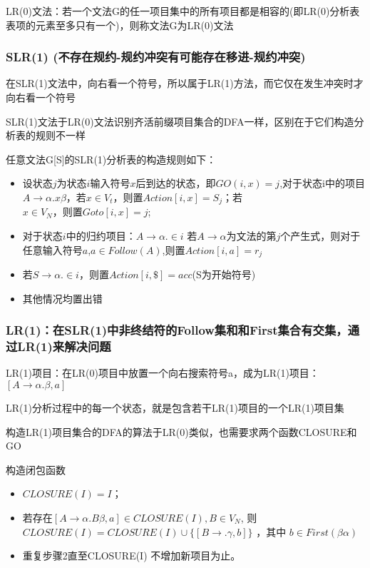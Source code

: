 \documentclass[utf8]{ctexart}
\begin{document}
LR(0)文法：若一个文法G的任一项目集中的所有项目都是相容的(即LR(0)分析表表项的元素至多只有一个)，则称文法G为LR(0)文法


\subsubsection{SLR(1) (不存在规约-规约冲突有可能存在移进-规约冲突)}

在SLR(1)文法中，向右看一个符号，所以属于LR(1)方法，而它仅在发生冲突时才向右看一个符号

SLR(1)文法于LR(0)文法识别齐活前缀项目集合的DFA一样，区别在于它们构造分析表的规则不一样

任意文法G[S]的SLR(1)分析表的构造规则如下：

\begin{itemize}
    \item 设状态$j$为状态$i$输入符号$x$后到达的状态，即$GO(i,x)=j$,对于状态i中的项目$A \rightarrow \alpha .x\beta$，若$x \in V_t$，则置$Action[i,x]=S_j$；若$x \in V_N，则置Goto[i,x]=j$;
    \item 对于状态$i$中的归约项目：$A\rightarrow \alpha . \in i$ 若$A \rightarrow \alpha$为文法的第$j$个产生式，则对于任意输入符号$a$,$a \in Follow(A)$,则置$Action[i,a]=r_j$
    \item 若$S \rightarrow \alpha. \in i$，则置$Action[i,\$]=acc$(S为开始符号)
    \item 其他情况均置出错
\end{itemize}

\subsubsection{LR(1)：在SLR(1)中非终结符的Follow集和和First集合有交集，通过LR(1)来解决问题}

LR(1)项目：在LR(0)项目中放置一个向右搜索符号a，成为LR(1)项目：$[A\rightarrow \alpha .\beta, a]$

LR(1)分析过程中的每一个状态，就是包含若干LR(1)项目的一个LR(1)项目集

构造LR(1)项目集合的DFA的算法于LR(0)类似，也需要求两个函数CLOSURE和GO

构造闭包函数
\begin{itemize}
    \item $CLOSURE(I)=I$；
    \item 若存在$[A \rightarrow \alpha .B \beta ,a] \in CLOSURE(I), B \in V_N$, 则$CLOSURE(I)= CLOSURE(I)\cup \{[B \rightarrow .\gamma, b]\}$ ，其中 $b \in First(\beta \alpha)$
    \item 重复步骤2直至CLOSURE(I) 不增加新项目为止。
\end{itemize}
\end{document}
